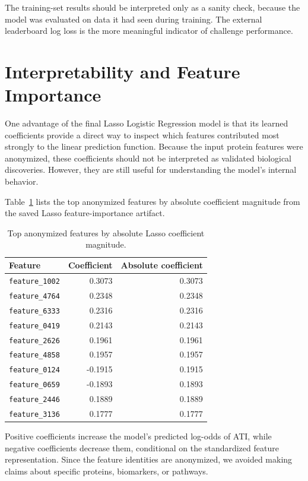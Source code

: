 \documentclass[11pt]{article}
\begin{document}
The training-set results should be interpreted only as a sanity check, because the model was evaluated on data it had seen during training. The external leaderboard log loss is the more meaningful indicator of challenge performance.

\section{Interpretability and Feature Importance}

One advantage of the final Lasso Logistic Regression model is that its learned coefficients provide a direct way to inspect which features contributed most strongly to the linear prediction function. Because the input protein features were anonymized, these coefficients should not be interpreted as validated biological discoveries. However, they are still useful for understanding the model's internal behavior.


Table~\ref{tab:topfeatures} lists the top anonymized features by absolute coefficient magnitude from the saved Lasso feature-importance artifact.

\begin{table}[h]
\centering
\begin{tabular}{lrr}
\toprule
\textbf{Feature} & \textbf{Coefficient} & \textbf{Absolute coefficient} \\
\midrule
\texttt{feature\_1002} & 0.3073 & 0.3073 \\
\texttt{feature\_4764} & 0.2348 & 0.2348 \\
\texttt{feature\_6333} & 0.2316 & 0.2316 \\
\texttt{feature\_0419} & 0.2143 & 0.2143 \\
\texttt{feature\_2626} & 0.1961 & 0.1961 \\
\texttt{feature\_4858} & 0.1957 & 0.1957 \\
\texttt{feature\_0124} & -0.1915 & 0.1915 \\
\texttt{feature\_0659} & -0.1893 & 0.1893 \\
\texttt{feature\_2446} & 0.1889 & 0.1889 \\
\texttt{feature\_3136} & 0.1777 & 0.1777 \\
\bottomrule
\end{tabular}
\caption{Top anonymized features by absolute Lasso coefficient magnitude.}
\label{tab:topfeatures}
\end{table}


Positive coefficients increase the model's predicted log-odds of ATI, while negative coefficients decrease them, conditional on the standardized feature representation. Since the feature identities are anonymized, we avoided making claims about specific proteins, biomarkers, or pathways.
\end{document}
